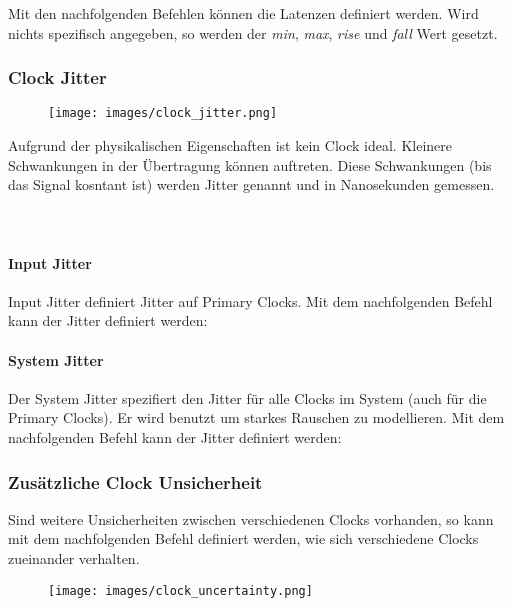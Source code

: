 Mit den nachfolgenden Befehlen können die Latenzen definiert werden. Wird nichts spezifisch angegeben, so werden der  \textit{min}, \textit{max}, \textit{rise} und \textit{fall} Wert gesetzt.


\subsubsection{Clock Jitter}
\begin{minipage}{0.3\textwidth}
    \begin{figure}[H]
        \texttt{[image: images/clock\_jitter.png]}
    \end{figure}
\end{minipage}
\hfill
\begin{minipage}{0.65\textwidth}
    Aufgrund der physikalischen Eigenschaften ist kein Clock ideal. Kleinere Schwankungen in der Übertragung können auftreten. Diese Schwankungen (bis das Signal kosntant ist) werden Jitter genannt und in Nanosekunden gemessen. \ \\ \ \\ \ \\
\end{minipage}

\paragraph{Input Jitter}
Input Jitter definiert Jitter auf Primary Clocks. Mit dem nachfolgenden Befehl kann der Jitter definiert werden:


\paragraph{System Jitter}
Der System Jitter spezifiert den Jitter für alle Clocks im System (auch für die Primary Clocks). Er wird benutzt um starkes Rauschen zu modellieren. Mit dem nachfolgenden Befehl kann der Jitter definiert werden:


\begin{multicols}{2}
    \subsubsection{Zusätzliche Clock Unsicherheit}
    Sind weitere Unsicherheiten zwischen verschiedenen Clocks vorhanden, so kann mit dem nachfolgenden Befehl definiert werden, wie sich verschiedene Clocks zueinander verhalten.
    
    \begin{figure}[H]
        \texttt{[image: images/clock\_uncertainty.png]}
    \end{figure}
\end{multicols}

